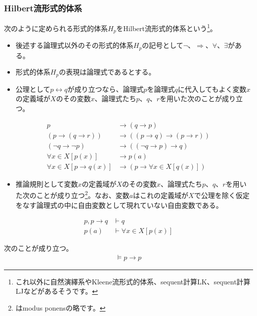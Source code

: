 \documentclass[a4paper]{jsarticle}
\begin{document}
\subsubsection{Hilbert流形式的体系}%
\begin{axs}
次のように定められる形式的体系$H_{p}$をHilbert流形式的体系という\footnote{これ以外に自然演繹系やKleene流形式的体系、sequent計算LK、sequent計算LJなどがあるそうです。}。
\begin{itemize}
\item
  後述する論理式以外のその形式的体系$H_{p}$の記号として$\neg$、$\Rightarrow$、$\forall$、$\exists$がある。
\item
  形式的体系$H_{p}$の表現は論理式であるとする。
\item
  公理として$p \leftrightarrow q$が成り立つなら、論理式$p$を論理式$q$に代入してもよく変数$x$の定義域が$X$のその変数$x$、論理式たち$p$、$q$、$r$を用いた次のことが成り立つ。
\end{itemize}
\begin{align}
p &\rightarrow (q \rightarrow p)\tag*{(A1)} \label{(A1)} \\
\left( p \rightarrow (q \rightarrow r) \right) &\rightarrow \left( (p \rightarrow q) \rightarrow (p \rightarrow r) \right)\tag*{(A2)} \label{(A2)} \\
(\neg q \rightarrow \neg p) &\rightarrow \left( (\neg q \rightarrow p) \rightarrow q \right)\tag*{(A3)} \label{(A3)} \\
\forall x \in X[p(x)] &\rightarrow p(a)\tag*{(A4)} \label{(A4)} \\
\forall x \in X[p \rightarrow q(x) ] &\rightarrow \left( p \rightarrow \forall x \in X[q(x)] \right)\tag*{(A5)} \label{(A5)}
\end{align}
\begin{itemize}
\item
  推論規則として変数$x$の定義域が$X$のその変数$x$、論理式たち$p$、$q$、$r$を用いた次のことが成り立つ\footnote{はmodus ponensの略です。}。なお、変数$a$はこれの定義域が$X$で公理を除く仮定をなす論理式の中に自由変数として現れていない自由変数である。
\end{itemize}
\begin{align}
p,p \rightarrow q &\vdash q\tag*{(MP)} \label{(MP)} \\
p(a) &\vdash \forall x \in X[p(x)]\tag*{(Gen)} \label{(Gen)}
\end{align}
\end{axs}
\begin{thm}
\label{1.1.1.1}
次のことが成り立つ。
\begin{align*}
\vDash p \rightarrow p
\end{align*}
\end{thm}
\end{document}
